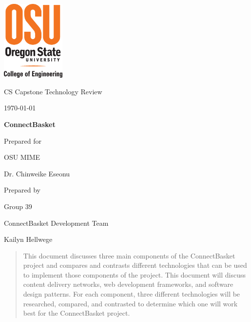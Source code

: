 \documentclass[onecolumn, draftclsnofoot,10pt, compsoc]{IEEEtran}
\def \CapstoneTeamName{		ConnectBasket Development Team}
\def \CapstoneTeamNumber{		39}
\def \GroupMemberOne{			Kailyn Hellwege}
\def \CapstoneProjectName{		ConnectBasket}
\def \CapstoneSponsorCompany{	OSU MIME}
\def \CapstoneSponsorPerson{		Dr. Chinweike Eseonu}
\def \DocType{		%
				Technology Review
				}
\newcommand{\NameSigPair}[1]{\par
\makebox[2.75in][r]{#1} \hfil 	\makebox[3.25in]{\makebox[2.25in]{\hrulefill} \hfill		\makebox[.75in]{\hrulefill}}
\par\vspace{-12pt} \textit{\tiny\noindent
\makebox[2.75in]{} \hfil		\makebox[3.25in]{\makebox[2.25in][r]{Signature} \hfill	\makebox[.75in][r]{Date}}}}
\renewcommand{\NameSigPair}[1]{#1}
\begin{document}
\begin{titlepage}
    \begin{singlespace}
    	\includegraphics[height=4cm]{coe_v_spot1}
        \hfill 
        \par\vspace{.2in}
        \centering
        \scshape{
            \huge CS Capstone \DocType \par
            {\large\today}\par
            \vspace{.5in}
            \textbf{\Huge\CapstoneProjectName}\par
            \vfill
            {\large Prepared for}\par
            \Huge \CapstoneSponsorCompany\par
            \vspace{5pt}
            {\Large\NameSigPair{\CapstoneSponsorPerson}\par}
            {\large Prepared by }\par
            Group\CapstoneTeamNumber\par
            \CapstoneTeamName\par 
            \vspace{5pt}
            {\Large
                \NameSigPair{\GroupMemberOne}\par
            }
            \vspace{20pt}
        }
        \begin{abstract}
        This document discusses three main components of the ConnectBasket project and compares and contrasts different technologies that can be used to implement those components of the project. This document will discuss content delivery networks, web development frameworks, and software design patterns. For each component, three different technologies will be researched, compared, and contrasted to determine which one will work best for the ConnectBasket project.
        \end{abstract}     
    \end{singlespace}
\end{titlepage}
\newpage
{}
\tableofcontents
\clearpage
\end{document}
